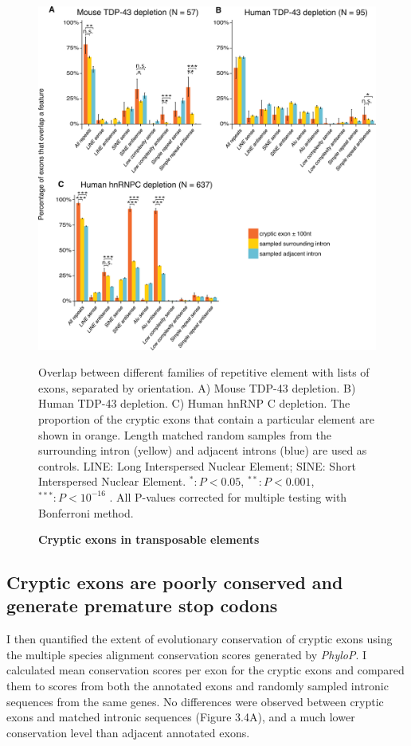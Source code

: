 \begin{figure}[h!]
	\centering
	\includegraphics[width=\textwidth]{Figures/03_cryptic_exons/Figure_3_repeat_elements.png}
	\caption{\textbf{Cryptic exons in transposable elements}}
		Overlap between different families of repetitive element with lists of exons, separated by orientation. A) Mouse TDP-43 depletion. B) Human TDP-43 depletion. C) Human hnRNP C depletion. The proportion of the cryptic exons that contain a particular element are shown in orange. Length matched random samples from the surrounding intron (yellow) and adjacent introns (blue) are used as controls. LINE: Long Interspersed Nuclear Element; SINE: Short Interspersed Nuclear Element.  $^*: P < 0.05$, $^{**}: P < 0.001$, $^{***}: P < 10^{-16}$ . All P-values corrected for multiple testing with Bonferroni method.
	\label{fig:cryptic_repeats}
\end{figure}

\subsection{Cryptic exons are poorly conserved and generate premature stop codons}
I then quantified the extent of evolutionary conservation of cryptic exons using the multiple species alignment conservation scores generated by \textit{PhyloP}. I calculated mean conservation scores per exon for the cryptic exons and compared them to scores from both the annotated exons and randomly sampled intronic sequences from the same genes. No differences were observed between cryptic exons and matched intronic sequences (Figure 3.4A), and a much lower conservation level than adjacent annotated exons.


